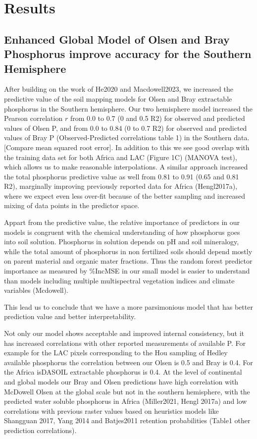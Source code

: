 \section{Results}
\subsection{Enhanced Global Model of Olsen and Bray Phosphorus improve accuracy for the Southern Hemisphere}
After building on the work of He2020 and Macdowell2023, we increased the predictive value of the soil mapping models for Olsen and Bray extractable phosphorus in the Southern hemisphere. Our two hemisphere model increased the Pearson correlation $r$ from 0.0 to 0.7 (0 and 0.5 R2) for observed and predicted values of Olsen P, and  from 0.0 to 0.84 (0 to 0.7 R2) for observed and predicted values of Bray P (Observed-Predicted correlations table 1) in the Southern data.  [Compare mean squared root error]. In addition to this we see good overlap with the training data set for both Africa and LAC (Figure 1C) (MANOVA test), which allows us to make reasonable interpolations. A similar approach increased the total phosphorus predictive value as well from 0.81 to 0.91 (0.65 and 0.81 R2), marginally improving previously reported data for Africa (Hengl2017a), where we expect even less over-fit because of the better sampling and increased mixing of data points in the predictor space.

Appart from the predictive value,  the relative importance of  predictors in our models is congruent with the chemical understanding of how phosphorus goes into soil solution.
Phosphorus in solution depends on pH and soil mineralogy, while the total amount of phosphorus in non fertilized soils should depend mostly on parent material and organic mater fractions.
Thus the random forest predictor importance as measured by \%IncMSE in our small model is easier to understand than models including multiple multispectral vegetation indices and climate variables (Mcdowell).

This lead us to conclude that we have a more parsimonious model that has better prediction value and better interpretability.

Not only our model shows acceptable and improved internal consistency, but it has increased correlations with other reported measurements of available P. For example for the LAC pixels corresponding to the Hou sampling of Hedley available phosphorus the correlation between our Olsen is 0.5  and Bray is 0.4. For the Africa isDASOIL extractable phosphorus is 0.4.
At the level of continental and global models our Bray and Olsen predictions have high correlation with McDowell Olsen at the global scale but not in the southern hemisphere, with the predicted water soluble phosphorus in Africa (Miller2021, Hengl 2017a) and low correlations with previous raster values based on heuristics models like Shangguan 2017, Yang 2014 and Batjes2011 retention probabilities (Table1 other prediction correlations).

